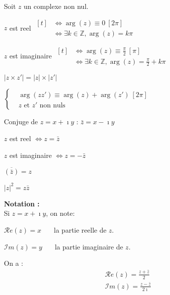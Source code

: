 \documentclass[12pt,twoside,a4paper]{article}
\begin{document}
			\begin{prop}
				Soit $z$ un complexe non nul.
				\begin{liste}
					\item $z$ est reel $\begin{aligned}[t]
											&\iff \arg\left(z\right)\equiv 0 \ \left[2\pi\right] \\
											&\iff \exists k\in\mathbb{Z},\arg\left(z\right)=k\pi
										\end{aligned}$
					\item $z$ est imaginaire $\begin{aligned}[t]
												&\iff \arg\left(z\right)\equiv \frac{\pi}{2} \ \left[\pi\right]\\
												&\iff \exists k\in\mathbb{Z},\arg\left(z\right)=\frac{\pi}{2}+k\pi
											  \end{aligned}$
				\end{liste}
			\end{prop}
			\begin{prop}
				\begin{liste}
					\item $|z\times z'|=|z|\times|z'|$
					\item $\left\{\begin{aligned}&\arg\left(zz'\right)\equiv\arg\left(z\right)+\arg\left(z'\right) \ \left[2\pi\right] \\
													  &z\text{ et }z'\text{ non nuls}\end{aligned}\right.$
				\end{liste}
			\end{prop}
			\begin{defi}
				Conjuge de $z=x+\imath y$ : $\bar{z}=x-\imath y$
			\end{defi}
			\begin{prop}
				\begin{liste}
					\item $z$ est reel $\iff z=\bar{z}$
					\item $z$ est imaginaire $\iff z=-\bar{z}$
					\item $\overline{\left(\bar{z}\right)}=z$
					\item $\left|z\right|^2=z\bar{z}$
				\end{liste}
			\end{prop}
			\textbf{Notation :}\\
			Si $z=x+\imath y$, on note:
			\begin{liste}
				\item[] $\mathcal{R}e\left(z\right)=x$ \ \ \ la partie reelle de $z$.
				\item[] $\mathcal{I}m\left(z\right)=y$ \ \ \ la partie imaginaire de $z$.
			\end{liste}
			On a :
			$$ \begin{aligned}
				\mathcal{R}e\left(z\right)=\frac{z+\bar{z}}{2} \\
				\mathcal{I}m\left(z\right)=\frac{z-\bar{z}}{2\imath}
			\end{aligned}$$
	
\end{document}

